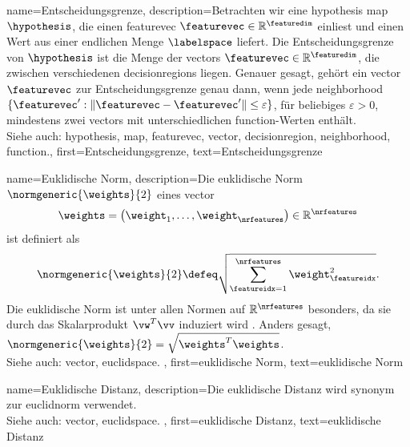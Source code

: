 {{{{
{
    name={Entscheidungsgrenze}, 
    description={Betrachten wir eine \gls{hypothesis} \gls{map} $\hypothesis$, 
                 die einen \gls{featurevec} $\featurevec \in \mathbb{R}^{\featuredim}$ einliest 
                 und einen Wert aus einer endlichen Menge $\labelspace$ liefert. 
                 Die Entscheidungsgrenze von $\hypothesis$ ist die Menge der \glspl{vector} $\featurevec \in \mathbb{R}^{\featuredim}$, 
                 die zwischen verschiedenen \glspl{decisionregion} liegen. Genauer gesagt, gehört ein 
                 \gls{vector} $\featurevec$ zur Entscheidungsgrenze genau dann, wenn jede 
                 \gls{neighborhood} $\{ \featurevec': \| \featurevec - \featurevec' \| \leq \varepsilon \}$, 
                 für beliebiges $\varepsilon >0$, mindestens zwei \glspl{vector} mit unterschiedlichen 
                 \gls{function}-Werten enthält.\\
                 Siehe auch: \gls{hypothesis}, \gls{map}, \gls{featurevec}, \gls{vector}, 
                 \gls{decisionregion}, \gls{neighborhood}, \gls{function}.},
    first={Entscheidungsgrenze},
    text={Entscheidungsgrenze} 
}



{
    name={Euklidische Norm}, 
    description={Die euklidische Norm $\normgeneric{\weights}{2}$ eines \gls{vector} 
                 $$\weights = \big(\weight_{1},\ldots,\weight_{\nrfeatures} \big) \in \mathbb{R}^{\nrfeatures}$$
                 ist definiert als 
                 $$\normgeneric{\weights}{2} \defeq \sqrt{\sum_{\featureidx=1}^{\nrfeatures}\weight^2_{\featureidx}}.$$ 
                 Die euklidische Norm ist unter allen Normen auf $\mathbb{R}^{\nrfeatures}$ besonders, 
                 da sie durch das Skalarprodukt $\vw^{T} \vv$ induziert wird \cite{RudinBook,HalmosFiniteDimVecSpace,BoydConvexBook}. 
                 Anders gesagt, $\normgeneric{\weights}{2}= \sqrt{\weights^{T} \weights}$.\\
                 Siehe auch: \gls{vector}, \gls{euclidspace}. },
    first={euklidische Norm},
    text={euklidische Norm} 
}

{
    name={Euklidische Distanz}, 
    description={Die euklidische Distanz wird synonym zur \gls{euclidnorm} verwendet.\\
                 Siehe auch: \gls{vector}, \gls{euclidspace}. },
    first={euklidische Distanz},
    text={euklidische Distanz} 
}

}}}}
